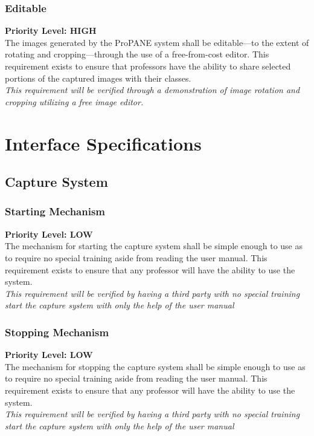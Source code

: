 \documentclass[]{article}
\begin{document}
			
			\subsubsection{Editable}
				\textbf{Priority Level: HIGH}\\
				The images generated by the ProPANE system shall be editable---to the extent of rotating and cropping---through the use of a free-from-cost editor. This requirement exists to ensure that professors have the ability to share selected portions of the captured images with their classes.\\
				\emph{This requirement will be verified through a demonstration of image rotation and cropping utilizing a free image editor.}
			
	
	\section{Interface Specifications}
		
		\subsection{Capture System}
			
			\subsubsection{Starting Mechanism}
				\textbf{Priority Level: LOW}\\
				The mechanism for starting the capture system shall be simple enough to use as to require no special training aside from reading the user manual. This requirement exists to ensure that any professor will have the ability to use the system.\\
				\emph{This requirement will be verified by having a third party with no special training start the capture system with only the help of the user manual}
				
			
			\subsubsection{Stopping Mechanism}
				\textbf{Priority Level: LOW}\\
				The mechanism for stopping the capture system shall be simple enough to use as to require no special training aside from reading the user manual. This requirement exists to ensure that any professor will have the ability to use the system.\\
				\emph{This requirement will be verified by having a third party with no special training start the capture system with only the help of the user manual}
		
\end{document}

